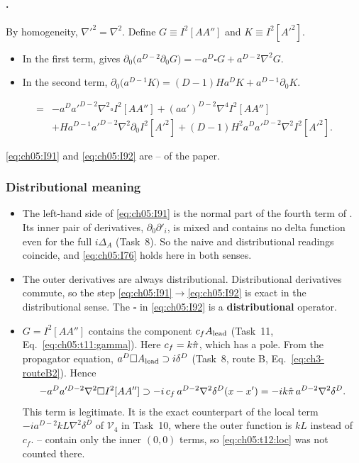 \paragraph{.} By homogeneity, $\nabla'^2=\nabla^2$. Define $G\equiv I^2[AA'']$ and $K\equiv I^2[A'^2]$.
\begin{itemize}[leftmargin=14pt]
\item In the first term,  gives $\partial_0\big(a^{D-2}\partial_0G\big)=-a^D\square G+a^{D-2}\nabla^2G$.
\item In the second term, $\partial_0\big(a^{D-1}K\big)=(D-1)Ha^DK+a^{D-1}\partial_0K$.
\end{itemize}
\begin{resultbox}
\begin{equation}
\begin{aligned}
={}&-a^Da'^{D-2}\nabla^2\square I^2[AA'']+(aa')^{D-2}\nabla^4I^2[AA'']\\
&+Ha^{D-1}a'^{D-2}\nabla^2\partial_0I^2[A'^2]+(D-1)H^2a^Da'^{D-2}\nabla^2I^2[A'^2].
\end{aligned}
\tag{I.92}\label{eq:ch05:I92}
\end{equation}
\end{resultbox}
\noindent \eqref{eq:ch05:I91} and \eqref{eq:ch05:I92} are -- of the paper.

\subsubsection[Distributional meaning]{Distributional meaning \tA}
\begin{itemize}[leftmargin=14pt]
\item The left-hand side of \eqref{eq:ch05:I91} is the normal part of the fourth term of .
Its inner pair of derivatives, $\partial_0\partial'_i$, is mixed and contains no delta function even for the full $i\Delta_A$ (Task~8).
So the naive and distributional readings coincide, and \eqref{eq:ch05:I76} holds here in both senses.
\item The outer derivatives are always distributional. Distributional derivatives commute, so the step \eqref{eq:ch05:I91}$\to$\eqref{eq:ch05:I92} is exact in the distributional sense.
The $\square$ in \eqref{eq:ch05:I92} is a \textbf{distributional} operator.
\item $G=I^2[AA'']$ contains the component $c_fA_{\rm lead}$ (Task~11, Eq.~\eqref{eq:ch05:t11:gamma}). Here $c_f=k\hat\pi$, which has a pole.
From the propagator equation, $a^D\square A_{\rm lead}\supset i\delta^D$ (Task~8, route B, Eq.~\eqref{eq:ch3-routeB2}). Hence
\begin{equation}
-a^Da'^{D-2}\nabla^2\square I^2[AA'']\supset-i\,c_f\,a^{D-2}\nabla^2\delta^D(x-x')=-ik\hat\pi\,a^{D-2}\nabla^2\delta^D .
\label{eq:ch05:t12:loc}
\end{equation}
This term is legitimate. It is the exact counterpart of the local term $-ia^{D-2}kL\nabla^2\delta^D$ of $\mathcal V_4$ in Task~10, where the outer function is $kL$ instead of $c_f$.
-- contain only the inner $(0,0)$ terms, so \eqref{eq:ch05:t12:loc} was not counted there.
\end{itemize}

